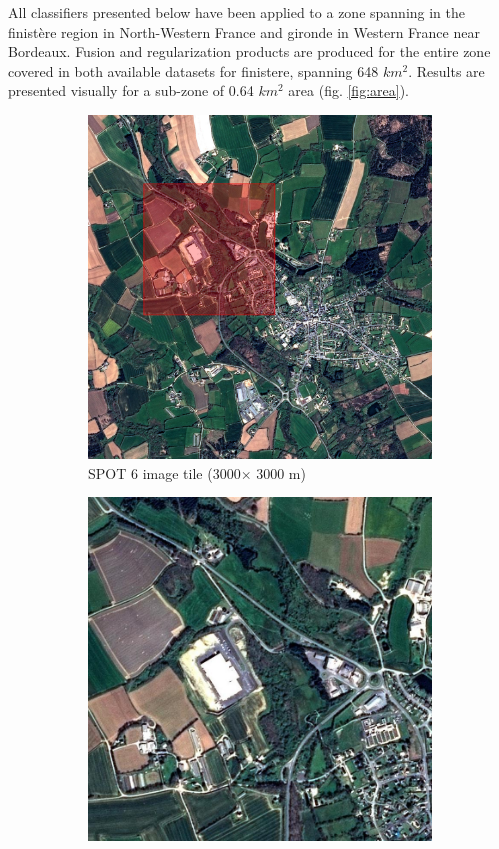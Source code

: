 \documentclass[10pt]{article}
\begin{document}
All classifiers presented below have been applied to a zone spanning in the finistère region in North-Western France and gironde in Western France near Bordeaux. Fusion and regularization products are produced for the entire zone covered in both available datasets for finistere, spanning 648 $km^2$. Results are presented visually for a sub-zone of 0.64 $km^2$ area (fig.  \ref{fig:area}).
\begin{figure}[H]
    \centering
    \begin{subfigure}{0.49\textwidth}
        \centering
        \includegraphics[width=.9\textwidth]{Im_SPOT6}
        \caption{SPOT 6 image tile (3000$\times$ 3000 m)}
        \label{fig:areaBig}
    \end{subfigure}
    \hfill
    \begin{subfigure}{0.49\textwidth}
        \centering
        \includegraphics[width=.9\textwidth]{Im_SPOT6_crop}

\end{subfigure}
\end{figure}
\end{document}
